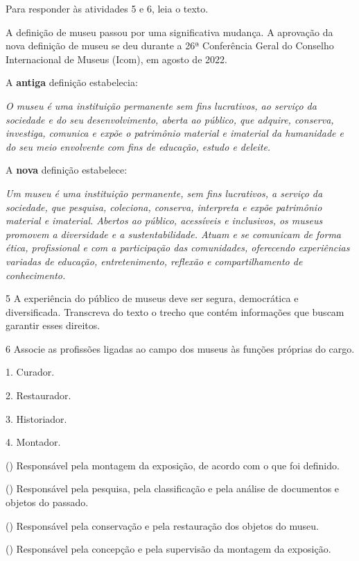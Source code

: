 \pagebreak

\noindent{}Para responder às atividades 5 e 6, leia o texto.

\begin{myquote}
A definição de museu passou por uma significativa mudança. A aprovação
da nova definição de museu se deu durante a 26ª Conferência Geral do
Conselho Internacional de Museus (Icom), em agosto de 2022.


A \textbf{antiga} definição estabelecia:

\emph{O museu é uma instituição permanente sem fins lucrativos, ao
serviço da sociedade e do seu desenvolvimento, aberta ao público, que
adquire, conserva, investiga, comunica e expõe o patrimônio material e
imaterial da humanidade e do seu meio envolvente com fins de educação,
estudo e deleite.}


A \textbf{nova} definição estabelece:

\emph{Um museu é uma instituição permanente, sem fins lucrativos, a
serviço da sociedade, que pesquisa, coleciona, conserva, interpreta e
expõe patrimônio material e imaterial. Abertos ao público, acessíveis e
inclusivos, os museus promovem a diversidade e a sustentabilidade. Atuam
e se comunicam de forma ética, profissional e com a participação das
comunidades, oferecendo experiências variadas de educação,
entretenimento, reflexão e compartilhamento de conhecimento.}

\end{myquote}

\num{5}  A experiência do público de museus deve ser segura, democrática e
  diversificada. Transcreva do texto o trecho que contém informações que
  buscam garantir esses direitos.


\num{6}  Associe as profissões ligadas ao campo dos museus às funções próprias do cargo.
\enlargethispage{2\baselineskip}

\begin{multicols}{2}

1. Curador.

2. Restaurador.

3. Historiador.

4. Montador.

\columnbreak

\noindent{}() Responsável pela montagem da exposição, de acordo com o que foi definido.

\noindent{}() Responsável pela pesquisa, pela classificação e pela análise de documentos e objetos do passado.

\noindent{}() Responsável pela conservação e pela restauração dos objetos do museu.

\noindent{}() Responsável pela concepção e pela supervisão da montagem da exposição.
\end{multicols}


